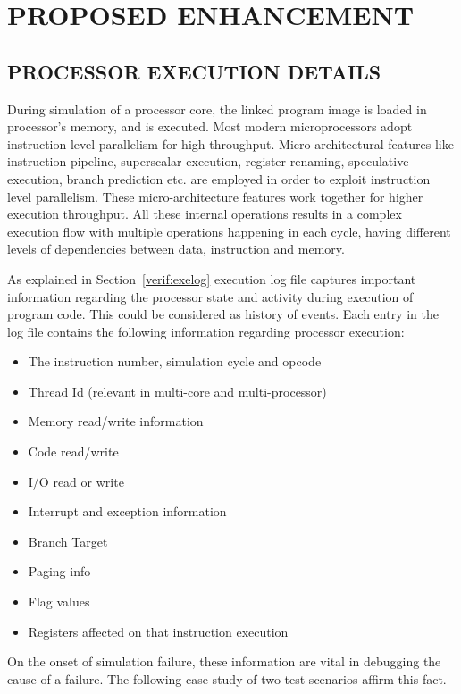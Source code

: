 \chapter{PROPOSED ENHANCEMENT}
\label{chap:enhancement.tex}

\section {PROCESSOR EXECUTION DETAILS}

During simulation of a processor core, the linked program image is loaded in processor's memory, and is executed. Most modern microprocessors adopt instruction level parallelism for high throughput. Micro-architectural features like instruction pipeline, superscalar execution, register renaming, speculative execution, branch prediction etc. are employed in order to exploit instruction level parallelism.  These micro-architecture features work together for higher execution throughput. All these internal operations results in a complex execution flow with multiple operations happening in each cycle, having different levels of dependencies between data, instruction and memory.


As explained in Section~\ref{verif:exelog} execution log file captures important information regarding the processor state and activity during execution of program code. This could be considered as history of events. Each entry in the log file contains the following information regarding processor execution:
\begin{itemize}
	\item The instruction number, simulation cycle and opcode
	\item Thread Id (relevant in multi-core and multi-processor)
	\item Memory read/write information
	\item Code read/write
	\item I/O read or write
	\item Interrupt and exception information
	\item Branch Target
	\item Paging info
	\item Flag values
	\item Registers affected on that instruction execution
\end{itemize}
On the onset of simulation failure, these information are vital in debugging the cause of a failure. The following case study of two test scenarios affirm this fact.

